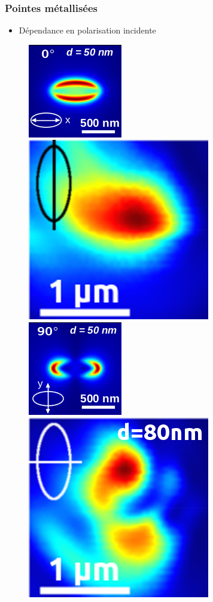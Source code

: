 \documentclass[9pt,a9paper,handout]{beamer}
\begin{document}
    \begin{frame}    
        \frametitle{Pointes métallisées}

        \begin{itemize} \item Dépendance en polarisation incidente
        \end{itemize}
        \vspace*{0mm}
        \vspace*{0mm}
        \begin{figure}[c]\centering
            \includegraphics[height=0.15\textwidth]{Images/Scans/theorie_polar_long}
            \quad
            \includegraphics[height=0.15\textwidth]{Images/Scans/polar_long}
            \qquad\qquad
            \includegraphics[height=0.15\textwidth]{Images/Scans/theorie_polar_trans}
            \quad
            \includegraphics[height=0.15\textwidth]{Images/Scans/polar_trans}
            \vspace*{-3.5mm}
        \end{figure}


\end{frame}
\end{document}
